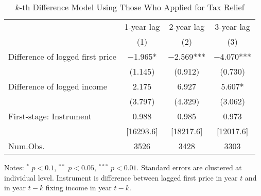 \begin{table}

\caption{$k$-th Difference Model Using Those Who Applied for Tax Relief \label{tab:kdiff-model}}
\centering
\begin{threeparttable}
\begin{tabular}[t]{lccc}
\toprule
\multicolumn{1}{c}{ } & \multicolumn{1}{c}{1-year lag} & \multicolumn{1}{c}{2-year lag} & \multicolumn{1}{c}{3-year lag} \\
\cmidrule(l{3pt}r{3pt}){2-2} \cmidrule(l{3pt}r{3pt}){3-3} \cmidrule(l{3pt}r{3pt}){4-4}
  & (1) & (2) & (3)\\
\midrule
Difference of logged first price & \num{-1.965}* & \num{-2.569}*** & \num{-4.070}***\\
 & (\num{1.145}) & (\num{0.912}) & (\num{0.730})\\
Difference of logged income & \num{2.175} & \num{6.927} & \num{5.607}*\\
 & (\num{3.797}) & (\num{4.329}) & (\num{3.062})\\
\midrule
First-stage: Instrument & 0.988 & 0.985 & 0.973\\
 & {}[16293.6] & {}[18217.6] & {}[12017.6]\\
Num.Obs. & \num{3526} & \num{3428} & \num{3303}\\
\bottomrule
\end{tabular}
\begin{tablenotes}
\item Notes: $^{*}$ $p < 0.1$, $^{**}$ $p < 0.05$, $^{***}$ $p < 0.01$. Standard errors are clustered at individual level. Instrument is difference between lagged first price in year $t$ and in year $t - k$ fixing income in year $t - k$.
\end{tablenotes}
\end{threeparttable}
\end{table}
